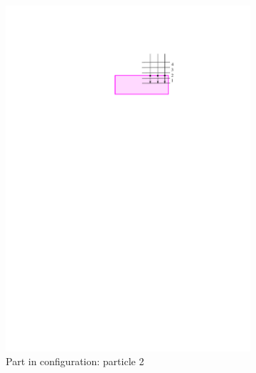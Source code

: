 \documentclass[../thesis.tex]{subfiles}
\begin{document}
\begin{figure}
\begin{subfigure}[b]{0.2\linewidth}
        \includegraphics[width=\textwidth, clip, trim=4.2in 8.4in 2.5in 1.7in]{./Localization/bins_p2}
        \caption{Part in configuration: particle 2}
        \label{bins:p2}
    \end{subfigure}
    \hfill
    \begin{subfigure}[b]{0.2\linewidth}

\end{subfigure}
\end{figure}
\end{document}
